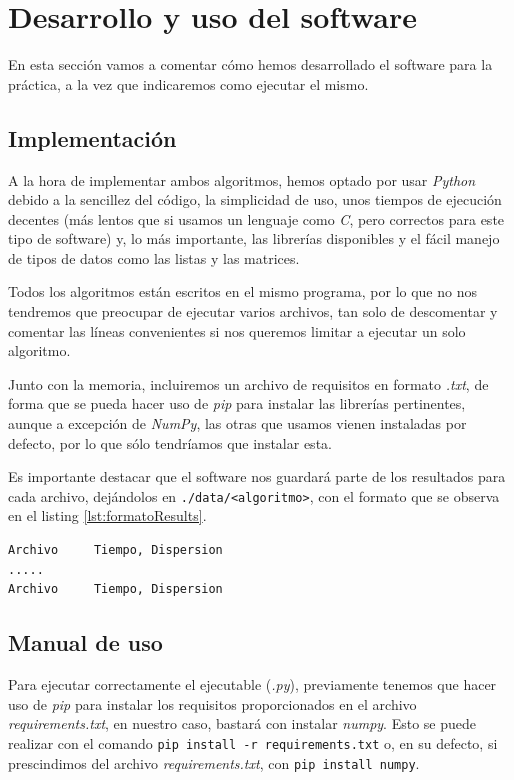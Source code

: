 \newpage

\section{Desarrollo y uso del software}

En esta sección vamos a comentar cómo hemos desarrollado el software para la práctica, a la vez que indicaremos como ejecutar el mismo.


\subsection{Implementación}

A la hora de implementar ambos algoritmos, hemos optado por usar \textit{Python} debido a la sencillez del código, la simplicidad de uso, unos tiempos de ejecución decentes (más lentos que si usamos un lenguaje como \textit{C}, pero correctos para este tipo de software) y, lo más importante, las librerías disponibles y el fácil manejo de tipos de datos como las listas y las matrices.

Todos los algoritmos están escritos en el mismo programa, por lo que no nos tendremos que preocupar de ejecutar varios archivos, tan solo de descomentar y comentar las líneas convenientes si nos queremos limitar a ejecutar un solo algoritmo.

Junto con la memoria, incluiremos un archivo de requisitos en formato \textit{.txt}, de forma que se pueda hacer uso de \textit{pip} para instalar las librerías pertinentes, aunque a excepción de \textit{NumPy}, las otras que usamos vienen instaladas por defecto, por lo que sólo tendríamos que instalar esta.

Es importante destacar que el software nos guardará parte de los resultados para cada archivo, dejándolos en \texttt{./data/<algoritmo>}, con el formato que se observa en el listing \ref{lst:formatoResults}.

\begin{lstlisting}[frame=single, caption={Formato de los archivos para guardar la evolución de los algoritmos}, captionpos=b, label=lst:formatoResults]
Archivo     Tiempo, Dispersion
.....
Archivo     Tiempo, Dispersion
\end{lstlisting}

\subsection{Manual de uso}

Para ejecutar correctamente el ejecutable (\textit{.py}), previamente tenemos que hacer uso de \textit{pip} para instalar los requisitos proporcionados en el archivo \textit{requirements.txt}, en nuestro caso, bastará con instalar \textit{numpy}.
Esto se puede realizar con el comando \texttt{pip install -r requirements.txt} o, en su defecto, si prescindimos del archivo \textit{requirements.txt}, con \texttt{pip install numpy}.

